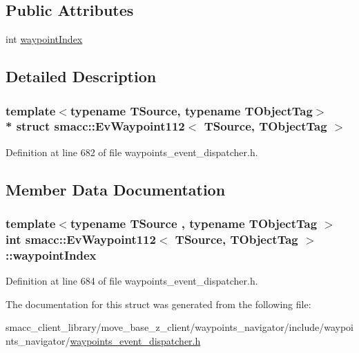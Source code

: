 \subsection*{Public Attributes}
\begin{DoxyCompactItemize}
\item 
int \hyperlink{structsmacc_1_1EvWaypoint112_ae30543aeee7a849429a5057798faf66e}{waypoint\+Index}
\end{DoxyCompactItemize}


\subsection{Detailed Description}
\subsubsection*{template$<$typename T\+Source, typename T\+Object\+Tag$>$\\*
struct smacc\+::\+Ev\+Waypoint112$<$ T\+Source, T\+Object\+Tag $>$}



Definition at line 682 of file waypoints\+\_\+event\+\_\+dispatcher.\+h.



\subsection{Member Data Documentation}
\subsubsection[{\texorpdfstring{waypoint\+Index}{waypointIndex}}]{\setlength{\rightskip}{0pt plus 5cm}template$<$typename T\+Source , typename T\+Object\+Tag $>$ int {\bf smacc\+::\+Ev\+Waypoint112}$<$ T\+Source, T\+Object\+Tag $>$\+::waypoint\+Index}\hypertarget{structsmacc_1_1EvWaypoint112_ae30543aeee7a849429a5057798faf66e}{}\label{structsmacc_1_1EvWaypoint112_ae30543aeee7a849429a5057798faf66e}


Definition at line 684 of file waypoints\+\_\+event\+\_\+dispatcher.\+h.



The documentation for this struct was generated from the following file\+:\begin{DoxyCompactItemize}
\item 
smacc\+\_\+client\+\_\+library/move\+\_\+base\+\_\+z\+\_\+client/waypoints\+\_\+navigator/include/waypoints\+\_\+navigator/\hyperlink{waypoints__event__dispatcher_8h}{waypoints\+\_\+event\+\_\+dispatcher.\+h}\end{DoxyCompactItemize}
